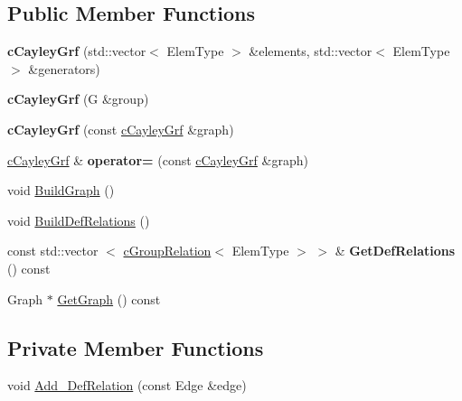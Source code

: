 \subsection*{\-Public \-Member \-Functions}
\begin{DoxyCompactItemize}
\item 
\hypertarget{classcCayleyGrf_ac94c0ddf2262aab4ce17454fb10e7286}{{\bfseries c\-Cayley\-Grf} (std\-::vector$<$ \-Elem\-Type $>$ \&elements, std\-::vector$<$ \-Elem\-Type $>$ \&generators)}\label{classcCayleyGrf_ac94c0ddf2262aab4ce17454fb10e7286}

\item 
\hypertarget{classcCayleyGrf_a6f1bc787dd952aae0b5e5d4d6d39fe35}{{\bfseries c\-Cayley\-Grf} (\-G \&group)}\label{classcCayleyGrf_a6f1bc787dd952aae0b5e5d4d6d39fe35}

\item 
\hypertarget{classcCayleyGrf_ae597aa2fce821346c6f3976e70eb6a75}{{\bfseries c\-Cayley\-Grf} (const \hyperlink{classcCayleyGrf}{c\-Cayley\-Grf} \&graph)}\label{classcCayleyGrf_ae597aa2fce821346c6f3976e70eb6a75}

\item 
\hypertarget{classcCayleyGrf_a31a02f7a0e7702fe953409f7f82888be}{\hyperlink{classcCayleyGrf}{c\-Cayley\-Grf} \& {\bfseries operator=} (const \hyperlink{classcCayleyGrf}{c\-Cayley\-Grf} \&graph)}\label{classcCayleyGrf_a31a02f7a0e7702fe953409f7f82888be}

\item 
void \hyperlink{classcCayleyGrf_a4a0ff02aa7bb9d556456b34e9f66f3d9}{\-Build\-Graph} ()
\item 
void \hyperlink{classcCayleyGrf_a8517436f6101a294fa7f30355efaa196}{\-Build\-Def\-Relations} ()
\item 
\hypertarget{classcCayleyGrf_a77314418cd7c7e09f5ed92db3fb77b6f}{const std\-::vector\*
$<$ \hyperlink{classcGroupRelation}{c\-Group\-Relation}$<$ \-Elem\-Type $>$ $>$ \& {\bfseries \-Get\-Def\-Relations} () const }\label{classcCayleyGrf_a77314418cd7c7e09f5ed92db3fb77b6f}

\item 
\-Graph $\ast$ \hyperlink{classcCayleyGrf_aeb4d8533b65921ca63fdaaf4516f92f6}{\-Get\-Graph} () const 
\end{DoxyCompactItemize}
\subsection*{\-Private \-Member \-Functions}
\begin{DoxyCompactItemize}
\item 
void \hyperlink{classcCayleyGrf_a5aef2537b624f06052dc852890b37048}{\-Add\-\_\-\-Def\-Relation} (const \-Edge \&edge)
\end{DoxyCompactItemize}

